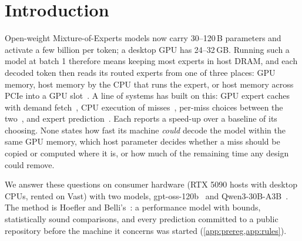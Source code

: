 \documentclass[10pt,twocolumn]{article}
\begin{document}
\section{Introduction}
Open-weight Mixture-of-Experts models now carry 30--120\,B parameters and activate a few billion per token; a desktop
GPU has 24--32\,GB. Running such a model at batch 1 therefore means keeping most experts in host DRAM, and each
decoded token then reads its routed experts from one of three places: GPU memory, host memory by the CPU that runs the
expert, or host memory across PCIe into a GPU slot~\cite{ivanov2021datamovement,hoefler2021sparsity}. A line of
systems has built on this: GPU expert caches with demand fetch~\cite{eliseev2023offloading,xue2024moeinfinity,song2024promoe},
CPU execution of misses~\cite{kamahori2024fiddler,ktransformers,zhong2025hybrimoe,huang2025cpugpu,daop2025,dali2026},
per-miss choices between the two~\cite{freetoken}, and expert prediction~\cite{hwang2024pregated,zhu2025preattention,wang2026seqmoe}.
Each reports a speed-up over a baseline of its choosing. None states how fast its machine \emph{could} decode the model
within the same GPU memory, which host parameter decides whether a miss should be copied or computed where it is,
or how much of the remaining time any design could remove.

We answer these questions on consumer hardware (RTX 5090 hosts with desktop CPUs, rented on Vast) with two
models, gpt-oss-120b~\cite{openai2025gptoss} and Qwen3-30B-A3B~\cite{yang2025qwen3}. The method is Hoefler and Belli's~\cite{hoefler2015benchmarking}:
a performance model with bounds, statistically sound comparisons, and every prediction committed to a public repository
before the machine it concerns was started (\cref{app:prereg,app:rules}).
\end{document}
